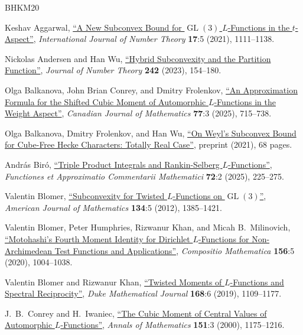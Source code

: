 \documentclass[11pt,a4paper]{amsart}
\DeclareMathOperator{\GL}{GL}
\numberwithin{equation}{section}
\theoremstyle{remark}
\theoremstyle{definition}
\begin{document}
\begin{thebibliography}{BHKM20}

 Keshav Aggarwal, \href{https://doi.org/10.1142/S1793042121500275}{``A New Subconvex Bound for $\GL(3)$ $L$-Functions in the $t$-Aspect''}, \textit{International Journal of Number Theory} \textbf{17}:5 (2021), 1111--1138.

 Nickolas Andersen and Han Wu, \href{https://doi.org/10.1016/j.jnt.2022.07.012}{``Hybrid Subconvexity and the Partition Function''}, \textit{Journal of Number Theory} \textbf{242} (2023), 154--180.

 Olga Balkanova, John Brian Conrey, and Dmitry Frolenkov, \href{https://doi.org/10.4153/S0008414X23000512}{``An Approximation Formula for the Shifted Cubic Moment of Automorphic $L$-Functions in the Weight Aspect''}, \textit{Canadian Journal of Mathematics} \textbf{77}:3 (2025), 715--738.

 Olga Balkanova, Dmitry Frolenkov, and Han Wu, \href{https://arxiv.org/abs/2108.12283v5}{``On Weyl's Subconvex Bound for Cube-Free Hecke Characters: Totally Real Case''}, preprint (2021), 68 pages.

 Andr\'{a}s Bir\'{o}, \href{https://doi.org/10.7169/facm/241017-11-11}{``Triple Product Integrals and Rankin-Selberg $L$-Functions''}, \textit{Functiones et Approximatio Commentarii Mathematici} \textbf{72}:2 (2025), 225--275.

 Valentin Blomer, \href{https://doi.org/10.1353/ajm.2012.0032}{``Subconvexity for Twisted $L$-Functions on $\GL(3)$''}, \textit{American Journal of Mathematics} \textbf{134}:5 (2012), 1385--1421.

 Valentin Blomer, Peter Humphries, Rizwanur Khan, and Micah B.~Milinovich, \href{https://doi.org/10.1112/S0010437X20007101}{``Motohashi's Fourth Moment Identity for Dirichlet $L$-Functions for Non-Archimedean Test Functions and Applications''}, \textit{Compositio Mathematica} \textbf{156}:5 (2020), 1004--1038.

 Valentin Blomer and Rizwanur Khan, \href{https://doi.org/10.1215/00127094-2018-0060}{``Twisted Moments of $L$-Functions and Spectral Reciprocity''}, \textit{Duke Mathematical Journal} \textbf{168}:6 (2019), 1109--1177.

 J.~B.~Conrey and H.~Iwaniec, \href{https://doi.org/10.2307/121132}{``The Cubic Moment of Central Values of Automorphic $L$-Functions''}, \textit{Annals of Mathematics} \textbf{151}:3 (2000), 1175--1216.


\end{thebibliography}
\end{document}

